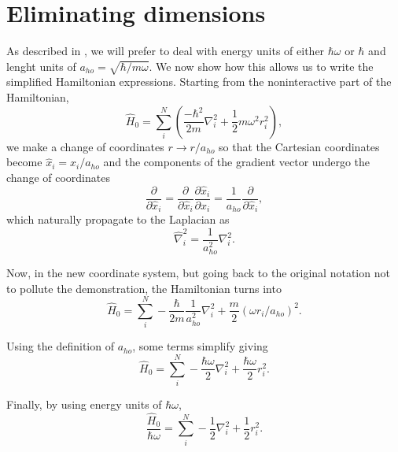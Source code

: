 \appendix
\renewcommand{\thesection}{\Alph{section}}

\section{Eliminating dimensions} \label{appendix:elim_dim}

As described in , we will prefer to deal with energy units of either $\hbar \omega$ or $\hbar$ and lenght units of $a_{ho} = \sqrt{\hbar/m\omega}$. We now show how this allows us to write the simplified Hamiltonian expressions. Starting from the noninteractive part of the Hamiltonian,
\begin{equation*}
    \hat{H}_0=\sum_i^N \left(\frac{-\hbar^2}{2m}{\nabla }_{i}^2 +\frac{1}{2}m\omega^2r_i^2\right), 
\end{equation*}
we make a change of coordinates $r\to r/a_{ho}$ so that the Cartesian coordinates become $\hat{x}_i = x_i/a_{ho}$ and the components of the gradient vector undergo the change of coordinates
 \begin{equation*}
     \frac{\partial }{\partial \hat{x}_i} =\frac{\partial }{\partial \hat{x}_i}\frac{\partial \hat{x}_i}{\partial x_i} = \frac{1}{a_{ho}}\frac{\partial }{\partial \hat{x}_i},
\end{equation*}
which naturally propagate to the Laplacian as
 \begin{equation*}
     {\hat{\nabla} }_{i}^2 = \frac{1}{a_{ho}^2}{\nabla }_{i}^2.
\end{equation*}

Now, in the new coordinate system, but going back to the original notation not to pollute the demonstration, the Hamiltonian turns into 
 \begin{equation*}
     \hat{H}_0 = \sum_i^N -\frac{\hbar}{2m}\frac{1}{a_{ho}^2}{\nabla }_{i}^2 + \frac{m}{2}\left(\omega r_i/a_{ho} \right)^2.
\end{equation*}

Using the definition of $a_{ho}$, some terms simplify giving 
 \begin{equation*}
     \hat{H}_0 = \sum_i^N -\frac{\hbar\omega}{2}{\nabla }_{i}^2 + \frac{\hbar\omega}{2}r_i^2.
\end{equation*}

Finally, by using energy units of $\hbar \omega$,
 \begin{equation*}
     \frac{\hat{H}_0}{\hbar \omega} = \sum_i^N -\frac{1}{2}{\nabla }_{i}^2 + \frac{1}{2}r_i^2.
\end{equation*}

